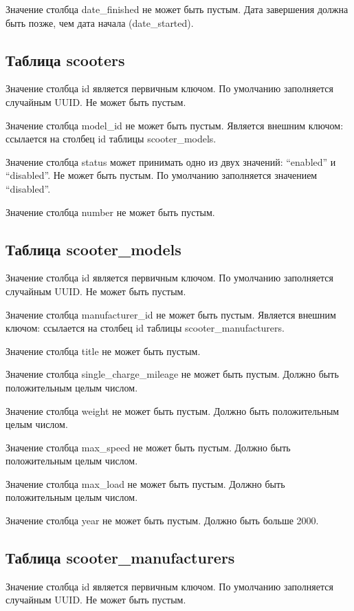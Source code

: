 Значение столбца date\_finished не может быть пустым. Дата завершения должна быть позже, чем дата начала (date\_started).

\subsection{Таблица scooters}

Значение столбца id является первичным ключом. По умолчанию заполняется случайным UUID. Не может быть пустым.

Значение столбца model\_id не может быть пустым. Является внешним ключом: ссылается на столбец id таблицы scooter\_models.

Значение столбца status может принимать одно из двух значений: \enquote{enabled} и \enquote{disabled}. Не может быть пустым. По умолчанию заполняется значением \enquote{disabled}.

Значение столбца number не может быть пустым.

\subsection{Таблица scooter\_models}

Значение столбца id является первичным ключом. По умолчанию заполняется случайным UUID. Не может быть пустым.

Значение столбца manufacturer\_id не может быть пустым. Является внешним ключом: ссылается на столбец id таблицы scooter\_manufacturers.

Значение столбца title не может быть пустым.

Значение столбца single\_charge\_mileage не может быть пустым. Должно быть положительным целым числом.

Значение столбца weight не может быть пустым. Должно быть положительным целым числом.

Значение столбца max\_speed не может быть пустым. Должно быть положительным целым числом.

Значение столбца max\_load не может быть пустым. Должно быть положительным целым числом.

Значение столбца year не может быть пустым. Должно быть больше 2000.

\subsection{Таблица scooter\_manufacturers}

Значение столбца id является первичным ключом. По умолчанию заполняется случайным UUID. Не может быть пустым.

